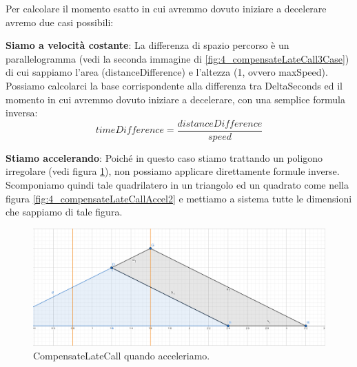 \documentclass[main.tex]{subfiles}
\begin{document}
Per calcolare il momento esatto in cui avremmo dovuto iniziare a decelerare avremo due casi possibili: 
\begin{itemize}
    \item \textbf{Siamo a velocità costante}: La differenza di spazio percorso è un parallelogramma (vedi la seconda immagine di \ref{fig:4_compensateLateCall3Case}) di cui sappiamo l'area (distanceDifference) e l'altezza (1, ovvero maxSpeed). Possiamo calcolarci la base corrispondente alla differenza tra DeltaSeconds ed il momento in cui avremmo dovuto iniziare a decelerare, con una semplice formula inversa:
    \[timeDifference = \frac{distanceDifference}{speed}\]
    
    \begin{minipage}{.45\textwidth}
        \item \textbf{Stiamo accelerando}: Poiché in questo caso stiamo trattando un poligono irregolare (vedi figura \ref{fig:4_compensateLateCallAccel1}), non possiamo applicare direttamente formule inverse. Scomponiamo quindi tale quadrilatero in un triangolo ed un quadrato come nella figura \ref{fig:4_compensateLateCallAccel2} e mettiamo a sistema tutte le dimensioni che sappiamo di tale figura.
    \end{minipage}
    \hfill%
    \begin{minipage}{.475\textwidth}
        \begin{figure}[H]
            \centering
            \includegraphics[scale=0.2]{img/interpolazione/compensateLateCallAccel1.png}
            \caption{CompensateLateCall quando acceleriamo.}
            \label{fig:4_compensateLateCallAccel1}
        \end{figure}
    \end{minipage}


\end{itemize}
\end{document}
